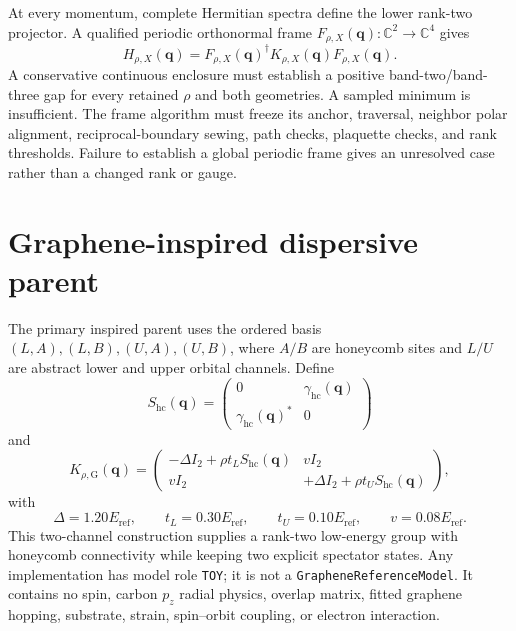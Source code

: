 \documentclass[11pt]{article}
\begin{document}
At every momentum, complete Hermitian spectra define the lower rank-two projector.  A
qualified periodic orthonormal frame
$F_{\rho,X}(\mathbf q):\mathbb C^2\to\mathbb C^4$ gives
\begin{equation}
 H_{\rho,X}(\mathbf q)
 =F_{\rho,X}(\mathbf q)^\dagger
  K_{\rho,X}(\mathbf q)F_{\rho,X}(\mathbf q).
 \label{eq:retained}
\end{equation}
A conservative continuous enclosure must establish a positive band-two/band-three gap
for every retained $\rho$ and both geometries.  A sampled minimum is insufficient.  The
frame algorithm must freeze its anchor, traversal, neighbor polar alignment,
reciprocal-boundary sewing, path checks, plaquette checks, and rank thresholds.  Failure
to establish a global periodic frame gives an unresolved case rather than a changed
rank or gauge.

\section{Graphene-inspired dispersive parent}

The primary inspired parent uses the ordered basis
$(L,A),(L,B),(U,A),(U,B)$, where $A/B$ are honeycomb sites and $L/U$ are abstract lower
and upper orbital channels.  Define
\begin{equation}
 S_{\mathrm{hc}}(\mathbf q)=
 \begin{pmatrix}
 0&\gamma_{\mathrm{hc}}(\mathbf q)\\
 \gamma_{\mathrm{hc}}(\mathbf q)^*&0
 \end{pmatrix}
\end{equation}
and
\begin{equation}
 K_{\rho,\mathrm G}(\mathbf q)=
 \begin{pmatrix}
 -\Delta I_2+\rho t_LS_{\mathrm{hc}}(\mathbf q)&vI_2\\
 vI_2&+\Delta I_2+\rho t_US_{\mathrm{hc}}(\mathbf q)
 \end{pmatrix},
 \label{eq:graphene-inspired-parent}
\end{equation}
with
\begin{equation}
 \Delta=1.20E_{\mathrm{ref}},
 \qquad t_L=0.30E_{\mathrm{ref}},
 \qquad t_U=0.10E_{\mathrm{ref}},
 \qquad v=0.08E_{\mathrm{ref}}.
\end{equation}
This two-channel construction supplies a rank-two low-energy group with honeycomb
connectivity while keeping two explicit spectator states.  Any implementation has model
role \texttt{TOY}; it is not a \texttt{GrapheneReferenceModel}.  It contains no spin, carbon
$p_z$ radial physics, overlap matrix, fitted graphene hopping, substrate, strain,
spin--orbit coupling, or electron interaction.
\end{document}
